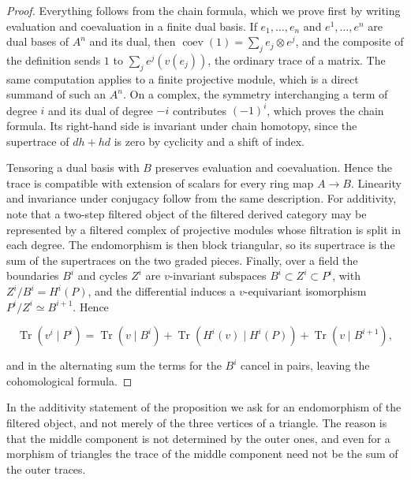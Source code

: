 \documentclass[11pt]{article}
\begin{document}
\begin{proof}[{Proof}]\label{bp8}%
Everything follows from the chain formula, which we prove first by writing evaluation and coevaluation in a finite dual basis. If \(e_1,\dots,e_n\) and \(e^1,\dots,e^n\) are dual bases of \(A^n\) and its dual, then \(\operatorname{coev}(1)=\sum_je_j\otimes e^j\), and the composite of the definition sends \(1\) to \(\sum_je^j(v(e_j))\), the ordinary trace of a matrix. The same computation applies to a finite projective module, which is a direct summand of such an \(A^n\). On a complex, the symmetry interchanging a term of degree \(i\) and its dual of degree \(-i\) contributes \((-1)^i\), which proves the chain formula. Its right-hand side is invariant under chain homotopy, since the supertrace of \(dh+hd\) is zero by cyclicity and a shift of index.

Tensoring a dual basis with \(B\) preserves evaluation and coevaluation. Hence the trace is compatible with extension of scalars for every ring map \(A\to B\). Linearity and invariance under conjugacy follow from the same description. For additivity, note that a two-step filtered object of the filtered derived category may be represented by a filtered complex of projective modules whose filtration is split in each degree. The endomorphism is then block triangular, so its supertrace is the sum of the supertraces on the two graded pieces. Finally, over a field the boundaries \(B^i\) and cycles \(Z^i\) are \(v\)-invariant subspaces \(B^i\subset Z^i\subset P^i\), with \(Z^i/B^i=H^i(P)\), and the differential induces a \(v\)-equivariant isomorphism \(P^i/Z^i\simeq B^{i+1}\). Hence

\[
\operatorname{Tr}(v^i\mid P^i)=\operatorname{Tr}(v\mid B^i)
+\operatorname{Tr}(H^i(v)\mid H^i(P))+\operatorname{Tr}(v\mid B^{i+1}),
\]

and in the alternating sum the terms for the \(B^i\) cancel in pairs, leaving the cohomological formula.
\end{proof}

\label{bp9}%
In the additivity statement of the proposition we ask for an endomorphism of the filtered object, and not merely of the three vertices of a triangle. The reason is that the middle component is not determined by the outer ones, and even for a morphism of triangles the trace of the middle component need not be the sum of the outer traces.
\end{document}
